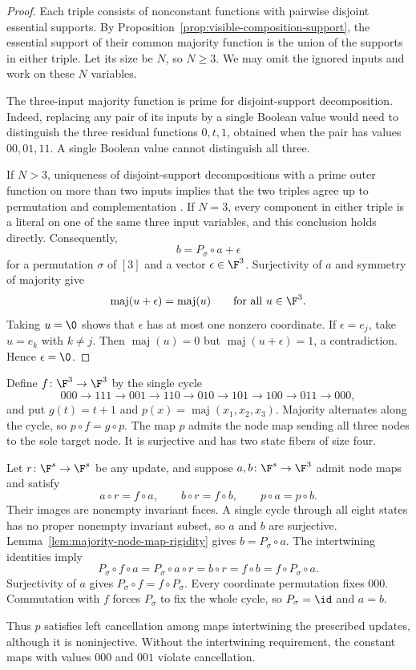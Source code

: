 \begin{proof}
Each triple consists of nonconstant functions with pairwise disjoint essential supports. By Proposition~\ref{prop:visible-composition-support}, the essential support of their common majority function is the union of the supports in either triple. Let its size be $N$, so $N\geq3$. We may omit the ignored inputs and work on these $N$ variables.

The three-input majority function is prime for disjoint-support decomposition. Indeed, replacing any pair of its inputs by a single Boolean value would need to distinguish the three residual functions $0,t,1$, obtained when the pair has values $00,01,11$. A single Boolean value cannot distinguish all three.

If $N>3$, uniqueness of disjoint-support decompositions with a prime outer function on more than two inputs implies that the two triples agree up to permutation and complementation \cite[Section~2.1]{bertacco1997disjunctive}. If $N=3$, every component in either triple is a literal on one of the same three input variables, and this conclusion holds directly. Consequently,
\[
    b=P_\sigma\circ a+\epsilon
\]
for a permutation $\sigma$ of $[3]$ and a vector $\epsilon\in\F^3$. Surjectivity of $a$ and symmetry of majority give
\[
    \operatorname{maj}(u+\epsilon)=\operatorname{maj}(u)
    \qquad\text{for all }u\in\F^3.
\]
Taking $u=\0$ shows that $\epsilon$ has at most one nonzero coordinate. If $\epsilon=e_j$, take $u=e_k$ with $k\ne j$. Then $\operatorname{maj}(u)=0$ but $\operatorname{maj}(u+\epsilon)=1$, a contradiction. Hence $\epsilon=\0$.
\end{proof}

\begin{example}\label{ex:majority-left-cancellation}
Define $f\colon\F^3\to\F^3$ by the single cycle
\[
    000\to111\to001\to110\to010\to101\to100\to011\to000,
\]
and put $g(t)=t+1$ and $p(x)=\operatorname{maj}(x_1,x_2,x_3)$. Majority alternates along the cycle, so $p\circ f=g\circ p$. The map $p$ admits the node map sending all three nodes to the sole target node. It is surjective and has two state fibers of size four.

Let $r\colon\F^s\to\F^s$ be any update, and suppose $a,b\colon\F^s\to\F^3$ admit node maps and satisfy
\[
    a\circ r=f\circ a,\qquad b\circ r=f\circ b,
    \qquad p\circ a=p\circ b.
\]
Their images are nonempty invariant faces. A single cycle through all eight states has no proper nonempty invariant subset, so $a$ and $b$ are surjective. Lemma~\ref{lem:majority-node-map-rigidity} gives $b=P_\sigma\circ a$. The intertwining identities imply
\[
    P_\sigma\circ f\circ a=P_\sigma\circ a\circ r
    =b\circ r=f\circ b=f\circ P_\sigma\circ a.
\]
Surjectivity of $a$ gives $P_\sigma\circ f=f\circ P_\sigma$. Every coordinate permutation fixes $000$. Commutation with $f$ forces $P_\sigma$ to fix the whole cycle, so $P_\sigma=\id$ and $a=b$.

Thus $p$ satisfies left cancellation among maps intertwining the prescribed updates, although it is noninjective. Without the intertwining requirement, the constant maps with values $000$ and $001$ violate cancellation.
\end{example}

